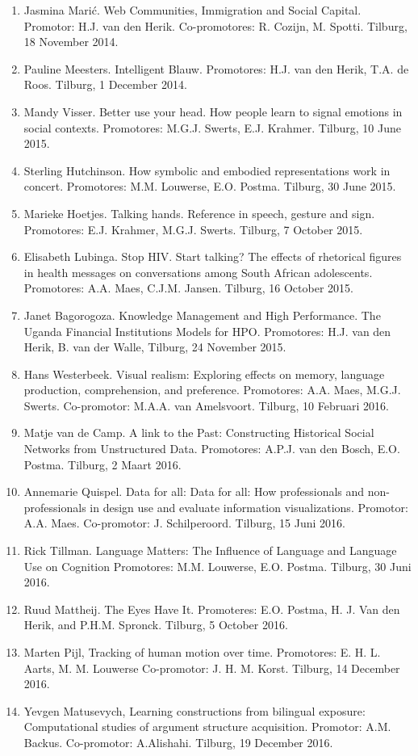 \begin{enumerate}
\item{ Jasmina Marić. Web Communities, Immigration and Social Capital.  
Promotor: H.J. van den
Herik. Co-promotores: R. Cozijn, M. Spotti. Tilburg, 18 November 2014.}
\item{ Pauline Meesters. Intelligent Blauw. Promotores: H.J. van den Herik, 
T.A.  de Roos. Tilburg, 1
December 2014.}
\item{ Mandy Visser. Better use your head. How people learn to signal emotions 
in social contexts.
Promotores: M.G.J. Swerts, E.J. Krahmer. Tilburg, 10 June 2015.}
\item{ Sterling Hutchinson. How symbolic and embodied representations work in 
concert.
Promotores: M.M. Louwerse, E.O. Postma. Tilburg, 30 June 2015.}
\item{ Marieke Hoetjes. Talking hands. Reference in speech, gesture and sign.  
Promotores: E.J.
Krahmer, M.G.J. Swerts. Tilburg, 7 October 2015.}
\item{ Elisabeth Lubinga. Stop HIV. Start talking? The effects of rhetorical 
figures in health messages
on conversations among South African adolescents. Promotores: A.A. Maes, C.J.M. Jansen.
Tilburg, 16 October 2015.}
\item{ Janet Bagorogoza. Knowledge Management and High Performance. The Uganda 
Financial
Institutions Models for HPO. Promotores: H.J. van den Herik, B. van der Walle, Tilburg, 24
November 2015.}
\item{ Hans Westerbeek. Visual realism: Exploring effects on memory, language 
production,
comprehension, and preference. Promotores: A.A. Maes, M.G.J. Swerts. Co-promotor:
M.A.A. van Amelsvoort. Tilburg, 10 Februari 2016.}
\item{ Matje van de Camp. A link to the Past: Constructing Historical Social 
Networks from
Unstructured Data. Promotores: A.P.J. van den Bosch, E.O. Postma. Tilburg, 2 
Maart 2016.}
\item{ Annemarie Quispel. Data for all: Data for all: How professionals and 
non-professionals in design
use and evaluate information visualizations. Promotor: A.A. Maes. Co-promotor:
J. Schilperoord. Tilburg, 15 Juni 2016.}
\item{ Rick Tillman. Language Matters: The Influence of Language and Language 
Use on Cognition
Promotores: M.M. Louwerse, E.O. Postma. Tilburg, 30 Juni 2016.}
\item{ Ruud Mattheij. The Eyes Have It. Promoteres: E.O. Postma, H. J. Van den 
Herik, and P.H.M.
Spronck. Tilburg, 5 October 2016.}
\item{ Marten Pijl, Tracking of human motion over time. Promotores: E. H. L.  
Aarts, M. M. Louwerse
Co-promotor: J. H. M. Korst. Tilburg, 14 December 2016.}
\item{ Yevgen Matusevych, Learning constructions from bilingual exposure: 
Computational studies
of argument structure acquisition. Promotor: A.M. Backus. Co-promotor: A.Alishahi. Tilburg,
19 December 2016.}


\end{enumerate}
